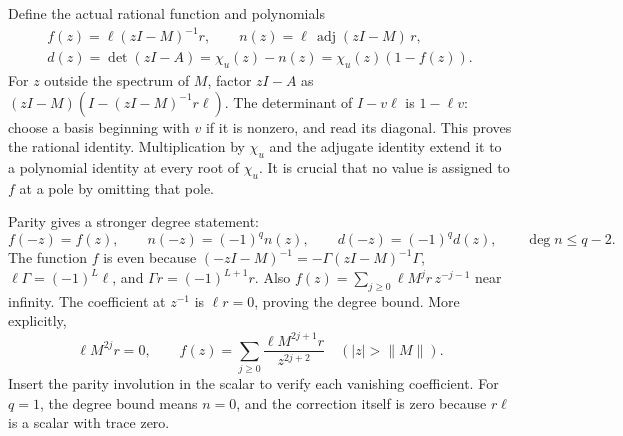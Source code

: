\documentclass[11pt]{article}
\begin{document}
Define the actual rational function and polynomials
\begin{equation}\tag{NS11}\label{NS11}
\begin{gathered}
f(z)=\ell(zI-M)^{-1}r,\qquad
n(z)=\ell\,\operatorname{adj}(zI-M)\,r,\\
d(z)=\det(zI-A)
=\chi_u(z)-n(z)
=\chi_u(z)(1-f(z)).
\end{gathered}
\end{equation}
For $z$ outside the spectrum of $M$, factor $zI-A$ as
$(zI-M)(I-(zI-M)^{-1}r\ell)$. The determinant of $I-v\ell$
is $1-\ell v$: choose a basis beginning with $v$ if it is
nonzero, and read its diagonal. This proves the rational
identity. Multiplication by $\chi_u$ and the adjugate
identity extend it to a polynomial identity at every root
of $\chi_u$. It is crucial that no value is assigned to
$f$ at a pole by omitting that pole.

Parity gives a stronger degree statement:
\begin{equation}\tag{NS12}\label{NS12}
f(-z)=f(z),\qquad
n(-z)=(-1)^qn(z),\qquad
d(-z)=(-1)^qd(z),\qquad
\deg n\leq q-2 .
\end{equation}
The function $f$ is even because
$(-zI-M)^{-1}=-\Gamma(zI-M)^{-1}\Gamma$,
$\ell\Gamma=(-1)^L\ell$, and $\Gamma r=(-1)^{L+1}r$.
Also
$f(z)=\sum_{j\geq0}\ell M^jr\,z^{-j-1}$ near infinity.
The coefficient at $z^{-1}$ is $\ell r=0$, proving the degree
bound. More explicitly,
\begin{equation}\tag{NS13}\label{NS13}
\ell M^{2j}r=0,\qquad
f(z)=\sum_{j\geq0}\frac{\ell M^{2j+1}r}{z^{2j+2}}
\quad(|z|>\|M\|).
\end{equation}
Insert the parity involution in the scalar to verify each
vanishing coefficient. For $q=1$, the degree bound means
$n=0$, and the correction itself is zero because $r\ell$
is a scalar with trace zero.
\end{document}
